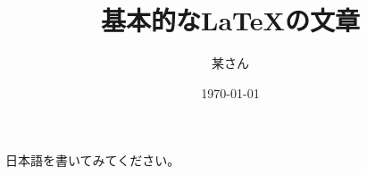 \documentclass{article}
\author{某さん}
\title{基本的な\LaTeX{}の文章}
\date{\today}
\begin{document}
\maketitle
日本語を書いてみてください。
\end{document}

